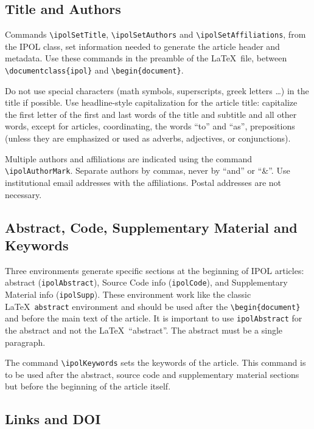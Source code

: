\documentclass{ipol}
\begin{document}
\subsection{Title and Authors}

Commands \verb|\ipolSetTitle|, \verb|\ipolSetAuthors| and
\verb|\ipolSetAffiliations|, from the IPOL class, set information
needed to generate the article header and metadata. Use these commands
in the preamble of the \LaTeX\ file, between
\verb|\documentclass{ipol}| and \verb|\begin{document}|.

Do not use special characters (math symbols, superscripts, greek
letters \ldots) in the title if possible. Use headline-style
capitalization for the article title: capitalize the first letter of
the first and last words of the title and subtitle and all other
words, except for articles, coordinating, the words ``to'' and ``as'',
prepositions (unless they are emphasized or used as adverbs,
adjectives, or conjunctions).

Multiple authors and affiliations are indicated using the command
\verb|\ipolAuthorMark|. Separate authors by commas, never by ``and''
or ``\&''. Use institutional email addresses with the
affiliations. Postal addresses are not necessary.

\subsection{Abstract, Code, Supplementary Material and Keywords}

Three environments generate specific sections at the beginning of IPOL
articles: abstract (\verb|ipolAbstract|), Source Code info
(\verb|ipolCode|), and Supplementary Material info
(\verb|ipolSupp|). These environment work like the classic
\LaTeX\ \verb|abstract| environment and should be used after the
\verb|\begin{document}| and before the main text of the article.
It is important to use \verb|ipolAbstract| for the abstract and
not the \LaTeX\ ``abstract''. The abstract must be a single paragraph.

The command \verb|\ipolKeywords| sets the keywords of the article.
This command is to be used after the abstract, source code and
supplementary material sections but before the beginning of the
article itself.

\subsection{Links and DOI}
\end{document}
